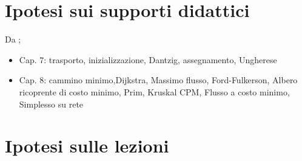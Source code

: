 \documentclass[a4paper,10pt]{article}
\begin{document}
\section{Ipotesi sui supporti didattici}

Da \cite{winston2004};
\begin{itemize}
\item Cap. 7: trasporto, inizializzazione, Dantzig, assegnamento, Ungherese
\item Cap. 8:
	cammino minimo,Dijkstra,
	Massimo flusso, Ford-Fulkerson,
	Albero ricoprente di costo minimo, Prim, Kruskal
	CPM,
	Flusso a costo minimo,
	Simplesso su rete
\end{itemize}
 
\section{Ipotesi sulle lezioni}
\end{document}
